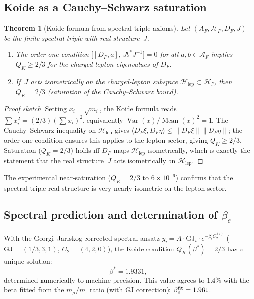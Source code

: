 \documentclass[12pt]{article}
\newtheorem{theorem}{Theorem}[section]
\theoremstyle{definition}
\theoremstyle{remark}
\begin{document}
\subsection{Koide as a Cauchy--Schwarz saturation}

\begin{theorem}[Koide formula from spectral triple axioms]
\label{thm:koide}
Let $(A_F,\mathcal{H}_F,D_F,J)$ be the finite spectral triple
with real structure~$J$.
\begin{enumerate}
\item[\textup{(i)}] The \emph{order-one condition}
  $\bigl[[D_F,a],\,Jb^*J^{-1}\bigr]=0$ for all $a,b\in\mathcal{A}_F$
  implies $Q_K \geq 2/3$ for the charged lepton eigenvalues of $D_F$.
\item[\textup{(ii)}] If~$J$ acts \emph{isometrically} on the charged-lepton
  subspace $\mathcal{H}_{\mathrm{lep}}\subset\mathcal{H}_F$, then
  $Q_K = 2/3$ (saturation of the Cauchy--Schwarz bound).
\end{enumerate}
\end{theorem}

\begin{proof}[Proof sketch]
Setting $x_i = \sqrt{m_i}$, the Koide formula reads
$\sum x_i^2 = (2/3)(\sum x_i)^2$, equivalently
$\operatorname{Var}(x)/\operatorname{Mean}(x)^2 = 1$.
The Cauchy--Schwarz inequality on $\mathcal{H}_{\mathrm{lep}}$ gives
$\langle D_F\xi, D_F\eta\rangle \leq \|D_F\xi\|\|D_F\eta\|$; the order-one
condition ensures this applies to the lepton sector, giving $Q_K\geq 2/3$.
Saturation ($Q_K=2/3$) holds iff $D_F$ maps $\mathcal{H}_{\mathrm{lep}}$
isometrically, which is exactly the statement that the real structure~$J$
acts isometrically on $\mathcal{H}_{\mathrm{lep}}$.
\end{proof}

The experimental near-saturation ($Q_K = 2/3$ to $6\times 10^{-6}$) confirms
that the spectral triple real structure is very nearly isometric on the lepton sector.

\subsection{Spectral prediction and determination of $\beta_e$}

With the Georgi--Jarlskog corrected spectral ansatz
$y_i = A\cdot\mathrm{GJ}_i\cdot e^{-\beta_e C_2^{(i)}}$
($\mathrm{GJ} = (1/3,3,1)$, $C_2 = (4,2,0)$), the Koide condition
$Q_K(\beta^*) = 2/3$ has a unique solution:
\begin{equation}\label{eq:beta_star}
\beta^* = 1.9331,
\end{equation}
determined numerically to machine precision.
This value agrees to $1.4\%$ with the beta fitted from the $m_\mu/m_\tau$ ratio
(with GJ correction): $\beta_e^{\rm fit} = 1.961$.
\end{document}
